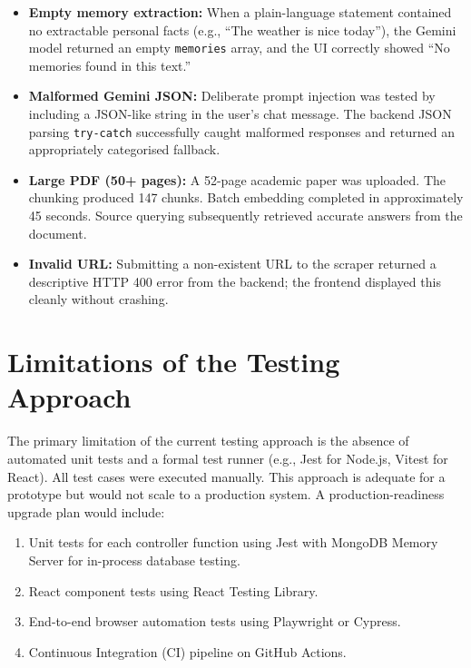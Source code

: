 \documentclass[12pt,a4paper]{report}
\begin{document}
\begin{itemize}
  \item \textbf{Empty memory extraction:} When a plain-language statement contained no extractable personal facts (e.g., ``The weather is nice today''), the Gemini model returned an empty \texttt{memories} array, and the UI correctly showed ``No memories found in this text.''
  \item \textbf{Malformed Gemini JSON:} Deliberate prompt injection was tested by including a JSON-like string in the user's chat message. The backend JSON parsing \texttt{try-catch} successfully caught malformed responses and returned an appropriately categorised fallback.
  \item \textbf{Large PDF (50+ pages):} A 52-page academic paper was uploaded. The chunking produced 147 chunks. Batch embedding completed in approximately 45 seconds. Source querying subsequently retrieved accurate answers from the document.
  \item \textbf{Invalid URL:} Submitting a non-existent URL to the scraper returned a descriptive HTTP 400 error from the backend; the frontend displayed this cleanly without crashing.
\end{itemize}

\section{Limitations of the Testing Approach}

The primary limitation of the current testing approach is the absence of automated unit tests and a formal test runner (e.g., Jest for Node.js, Vitest for React). All test cases were executed manually. This approach is adequate for a prototype but would not scale to a production system. A production-readiness upgrade plan would include:

\begin{enumerate}
  \item Unit tests for each controller function using Jest with MongoDB Memory Server for in-process database testing.
  \item React component tests using React Testing Library.
  \item End-to-end browser automation tests using Playwright or Cypress.
  \item Continuous Integration (CI) pipeline on GitHub Actions.
\end{enumerate}

\end{document}

